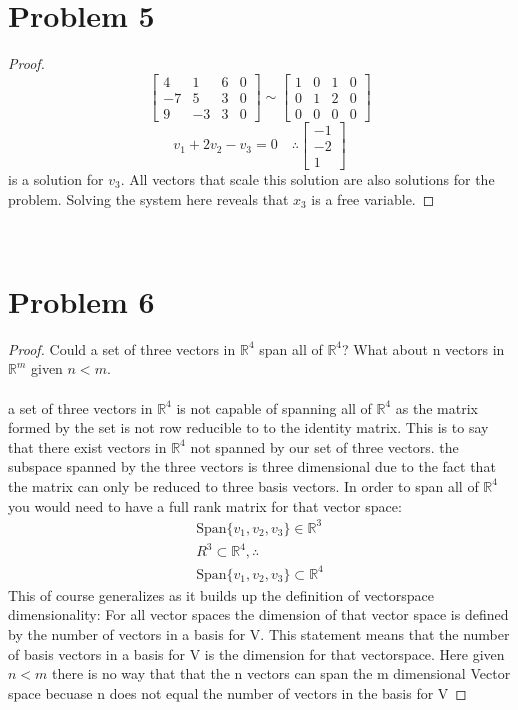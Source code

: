 \documentclass[12pt,a4paper]{article}
\newcommand{\R}{\mathbb{R}}
\begin{document}
\section*{Problem 5}
\begin{proof}
  \[
  \begin{bmatrix}
    4&1&6&0\\-7&5&3&0\\9&-3&3&0
  \end{bmatrix}
  \sim
  \begin{bmatrix}
    1&0&1&0\\0&1&2&0\\0&0&0&0
  \end{bmatrix}
  \]
  \[
    v_1+2v_2-v_3=0 \quad \therefore
  \begin{bmatrix}
      -1\\-2\\1
  \end{bmatrix}
  \]
  is a solution for $v_3$. All vectors that scale this solution are also solutions for the problem. Solving the system here reveals that $x_3$ is a free variable.
\end{proof}\\
\section*{Problem 6}
\begin{proof}
  Could a set of three vectors in $\R^4$ span all of $\R^4$? What about n vectors in $\R^m$ given $n<m$.\\\\
  a set of three vectors in $\R^4$ is not capable of spanning all of $\R^4$ as the matrix formed by the set is not row reducible to to the identity matrix. This is to say that there exist vectors in $\R^4$ not spanned by our set of three vectors. the subspace spanned by the three vectors is three dimensional due to the fact that the matrix can only be reduced to three basis vectors. In order to span all of $\R^4$ you would need to have a full rank matrix for that vector space:
  \begin{align*}
    \text{Span}\{v_1,v_2,v_3\} \in \R^3\\
    R^3 \subset \R^4, \therefore\\
      \text{Span}\{v_1,v_2,v_3\}\subset \R^4
  \end{align*}
  This of course generalizes as it builds up the definition of vectorspace dimensionality: For all vector spaces the dimension of that vector space is defined by the number of vectors in a basis for V. This statement means that the number of basis vectors in a basis for V is the dimension for that vectorspace. Here given $n<m$ there is no way that that the n vectors can span the m dimensional Vector space becuase n does not equal the number of vectors in the basis for V
\end{proof}\\
\end{document}
